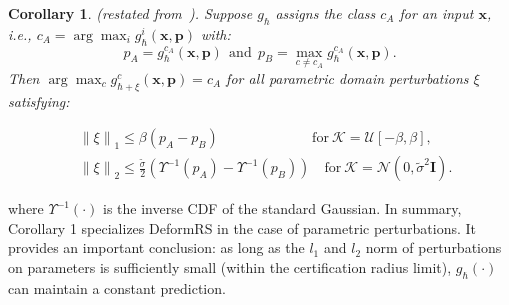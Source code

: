 \documentclass[10pt,journal,compsoc]{IEEEtran}
\newtheorem{corollary}{Corollary}
\begin{document}
\begin{corollary}  \label{corollary:1}
(restated from~\cite{alfarra2022deformrs}). Suppose $g_\hbar$ assigns the class $c_A$ for an input $\mathbf{x}$, i.e., $c_A = \arg \max_i g_\hbar^i(\mathbf{x}, \mathbf{p})$ with:
\begin{equation}
    p_A = g_\hbar^{c_A}(\mathbf{x}, \mathbf{p})~~\text{and}~~p_B = \max_{c\ne c_A}g_\hbar^{c_A}(\mathbf{x}, \mathbf{p}).
\end{equation}
Then $\arg \max_c g_{\hbar+\xi}^c(\mathbf{x}, \mathbf{p})=c_A$ for all parametric domain
 perturbations $\xi$ satisfying:

 \begin{equation}
 \begin{split}
&\left \| \xi \right \| _1 \le \beta (p_A-p_B) \quad \quad \quad \quad \quad \quad  ~ ~~\text{for}~\mathcal{K} = \mathcal{U}[-\beta, \beta], \\
&\left \| \xi \right \|_2 \le \frac{\tilde{\sigma}}{2} (\Upsilon^{-1}(p_A)-\Upsilon^{-1}(p_B) )\quad \text{for}~\mathcal{K}=\mathcal{N}(0, \tilde{\sigma}^2\mathbf{I}).
\end{split}
 \end{equation}
\end{corollary}
\noindent where $\Upsilon^{-1}(\cdot)$ is the inverse CDF of the standard Gaussian. In summary, Corollary 1 specializes DeformRS in the case of parametric perturbations. It provides an important conclusion: as long as the $l_1$ and $l_2$ norm of perturbations on parameters is sufficiently small (within the certification radius limit), $g_\hbar(\cdot)$ can maintain a constant prediction. 
\end{document}
